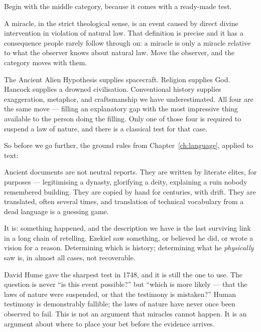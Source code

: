 Begin with the middle category, because it comes with a ready-made test.

A miracle, in the strict theological sense, is an event caused by direct divine intervention in
violation of natural law. That definition is precise and it has a consequence people rarely
follow through on: a miracle is only a miracle relative to what the observer knows about natural
law. Move the observer, and the category moves with them.

The Ancient Alien Hypothesis supplies spacecraft. Religion supplies God. Hancock supplies a
drowned civilisation. Conventional history supplies exaggeration, metaphor, and craftsmanship we
have underestimated. All four are the same move --- filling an explanatory gap with the most
impressive thing available to the person doing the filling. Only one of those four is required to
suspend a law of nature, and there is a classical test for that case.

So before we go further, the ground rules from Chapter~\ref{ch:language}, applied to text:

Ancient documents are not neutral reports. They are written by literate elites, for purposes ---
legitimising a dynasty, glorifying a deity, explaining a ruin nobody remembered building.
They are copied by hand for centuries, with drift. They are translated, often several times,
and translation of technical vocabulary from a dead language is a guessing game.

 It is: something happened, and the description we have is the last surviving link in a
long chain of retelling. Ezekiel saw something, or believed he did, or wrote a vision for a
reason. Determining which is history; determining what he \emph{physically} saw is, in almost
all cases, not recoverable.

\begin{funfact}
David Hume gave the sharpest test in 1748, and it is still the one to use. The question is never
``is this event possible?'' but ``which is more likely --- that the laws of nature were
suspended, or that the testimony is mistaken?'' Human testimony is demonstrably fallible; the
laws of nature have never once been observed to fail. This is not an argument that miracles
cannot happen. It is an argument about where to place your bet before the evidence arrives.
\end{funfact}

